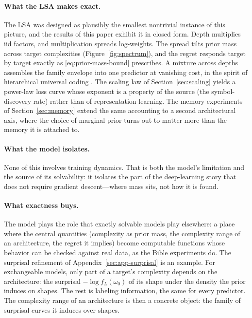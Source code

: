 \documentclass[11pt]{article}
\newcommand{\op}{\omega}             %
\begin{document}
\paragraph{What the LSA makes exact.}
The LSA was designed as plausibly the smallest nontrivial instance of this
picture, and the results of this paper exhibit it in closed form.  Depth
multiplies iid factors, and multiplication spreads log-weights.  The spread
tilts prior mass across target complexities (Figure~\ref{fig:spectrum}),
and the regret responds target by target exactly as
\eqref{eq:prior-mass-bound} prescribes.  A mixture across depths assembles
the family envelope into one predictor at vanishing cost, in the spirit of
hierarchical universal coding \cite{FederMerhavHierarchical}.  The scaling
law of Section~\ref{sec:scaling} yields a power-law loss curve whose
exponent is a property of the source (the symbol-discovery rate) rather
than of representation learning.  The memory experiments of
Section~\ref{sec:memory} extend the same accounting to a second
architectural axis, where the choice of marginal prior turns out to matter
more than the memory it is attached to.

\paragraph{What the model isolates.}
None of this involves training dynamics.  That is both the model's
limitation and the source of its solvability: it isolates the part of the
deep-learning story that does not require gradient descent---where mass
sits, not how it is found.

\paragraph{What exactness buys.}
The model plays the role that exactly solvable models play elsewhere: a place where the central quantities (complexity as prior mass, the
complexity range of an architecture, the regret it implies) become computable functions whose behavior can be checked
against real data, as the Bible experiments do.  The surprisal refinement
of Appendix~\ref{sec:app-surprisal} is an example.  For exchangeable
models, only part of a target's complexity depends on the architecture:
the surprisal \(-\log f_L(\op_0)\) of its shape under the density the
prior induces on shapes.  The rest is labeling information, the same
for every predictor.  The complexity range of an architecture is then
a concrete object: the family of surprisal curves it induces over
shapes.
\end{document}
